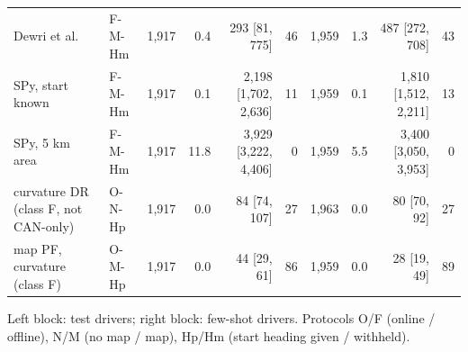 \begin{table}[t]
\begin{tabular}{llrrrrrrrr}
Dewri et al. & F-M-Hm & 1{,}917 & 0.4 & 293 [81, 775] & 46 & 1{,}959 & 1.3 & 487 [272, 708] & 43 \\
SPy, start known & F-M-Hm & 1{,}917 & 0.1 & 2{,}198 [1{,}702, 2{,}636] & 11 & 1{,}959 & 0.1 & 1{,}810 [1{,}512, 2{,}211] & 13 \\
SPy, 5 km area & F-M-Hm & 1{,}917 & 11.8 & 3{,}929 [3{,}222, 4{,}406] & 0 & 1{,}959 & 5.5 & 3{,}400 [3{,}050, 3{,}953] & 0 \\
curvature DR (class F, not CAN-only) & O-N-Hp & 1{,}917 & 0.0 & 84 [74, 107] & 27 & 1{,}963 & 0.0 & 80 [70, 92] & 27 \\
map PF, curvature (class F) & O-M-Hp & 1{,}917 & 0.0 & 44 [29, 61] & 86 & 1{,}959 & 0.0 & 28 [19, 49] & 89 \\
\bottomrule\end{tabular}
\par\smallskip\raggedright Left block: test drivers; right block: few-shot drivers. Protocols O/F (online / offline), N/M (no map / map), Hp/Hm (start heading given / withheld).
\end{table}
